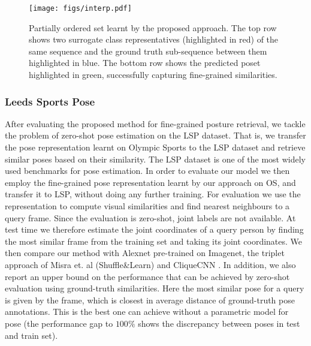 \documentclass[10pt,twocolumn,letterpaper]{article}
\begin{document}
\begin{figure*}[!t]
\texttt{[image: figs/interp.pdf]}
\caption{Partially ordered set learnt by the proposed approach. The top row shows two surrogate class representatives (highlighted in red) of the same sequence and the ground truth sub-sequence between them highlighted in blue. The bottom row shows the predicted poset highlighted in green, successfully capturing fine-grained similarities.}
\label{fig:interp}
\end{figure*}


\subsubsection{Leeds Sports Pose}

After evaluating the proposed method for fine-grained posture retrieval, we tackle the problem of zero-shot pose estimation on the LSP dataset. That is, we transfer the pose representation learnt on Olympic Sports to the LSP dataset and retrieve similar poses based on their similarity. The LSP \cite{lsp} dataset is one of the most widely used  benchmarks for pose estimation. In order to evaluate our model we then employ the fine-grained pose representation learnt by our approach on OS, and transfer it to LSP, without doing any further training. For evaluation we use the representation to compute visual similarities and find nearest neighbours to a query frame. Since the evaluation is zero-shot, joint labels are not available. At test time we therefore estimate the joint coordinates of a query person by finding the most similar frame from the training set and taking its joint coordinates. We then compare our method with Alexnet \cite{alexnet} pre-trained on Imagenet, the triplet approach of Misra et. al (Shuffle\&Learn) \cite{shuffleandlearn} and CliqueCNN \cite{cliquecnn}. In addition, we also report an upper bound on the performance that can be achieved by zero-shot evaluation using ground-truth similarities. Here the most similar pose for a query is given by the frame, which is closest in average distance of ground-truth pose annotations. This is the best one can achieve without a parametric model for pose (the performance gap to $100\%$ shows the discrepancy between poses in test and train set).
\end{document}
